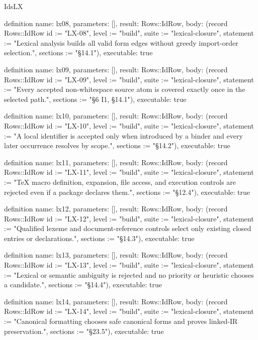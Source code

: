 \begin{lexlean}{IdsLX}
\begin{semanticmodule}
definition{
  name: lx08,
  parameters: [],
  result: Rows::IdRow,
  body: (record Rows::IdRow {id := "LX-08", level := "build", suite := "lexical-closure", statement := "Lexical analysis builds all valid form edges without greedy import-order selection.", sections := "§14.1"}),
  executable: true
}

definition{
  name: lx09,
  parameters: [],
  result: Rows::IdRow,
  body: (record Rows::IdRow {id := "LX-09", level := "build", suite := "lexical-closure", statement := "Every accepted non-whitespace source atom is covered exactly once in the selected path.", sections := "§6 I1, §14.1"}),
  executable: true
}

definition{
  name: lx10,
  parameters: [],
  result: Rows::IdRow,
  body: (record Rows::IdRow {id := "LX-10", level := "build", suite := "lexical-closure", statement := "A local identifier is accepted only when introduced by a binder and every later occurrence resolves by scope.", sections := "§14.2"}),
  executable: true
}

definition{
  name: lx11,
  parameters: [],
  result: Rows::IdRow,
  body: (record Rows::IdRow {id := "LX-11", level := "build", suite := "lexical-closure", statement := "TeX macro definition, expansion, file access, and execution controls are rejected even if a package declares them.", sections := "§12.4"}),
  executable: true
}

definition{
  name: lx12,
  parameters: [],
  result: Rows::IdRow,
  body: (record Rows::IdRow {id := "LX-12", level := "build", suite := "lexical-closure", statement := "Qualified lexeme and document-reference controls select only existing closed entries or declarations.", sections := "§14.3"}),
  executable: true
}

definition{
  name: lx13,
  parameters: [],
  result: Rows::IdRow,
  body: (record Rows::IdRow {id := "LX-13", level := "build", suite := "lexical-closure", statement := "Lexical or semantic ambiguity is rejected and no priority or heuristic chooses a candidate.", sections := "§14.4"}),
  executable: true
}

definition{
  name: lx14,
  parameters: [],
  result: Rows::IdRow,
  body: (record Rows::IdRow {id := "LX-14", level := "build", suite := "lexical-closure", statement := "Canonical formatting chooses safe canonical forms and proves linked-IR preservation.", sections := "§23.5"}),
  executable: true
}
\end{semanticmodule}
\end{lexlean}
